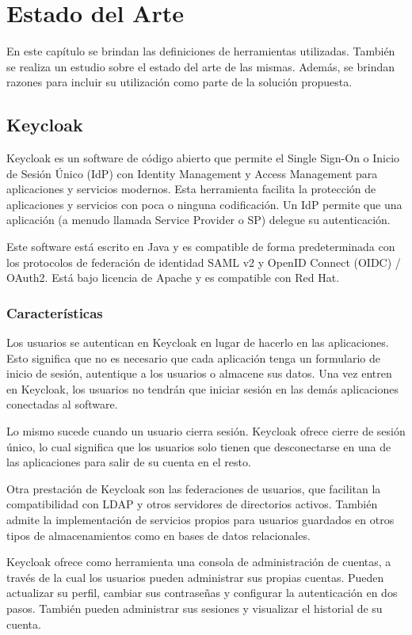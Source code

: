 \chapter{Estado del Arte}\label{chapter:state-of-the-art}
En este capítulo se brindan las definiciones de herramientas utilizadas. También se realiza un estudio sobre el estado del arte de las mismas. Además, se brindan razones para incluir su utilización como parte de la solución propuesta.

\section{Keycloak}
Keycloak es un software de código abierto que permite el Single Sign-On o Inicio de Sesión Único (IdP) con Identity Management y Access Management para aplicaciones y servicios modernos. Esta herramienta facilita la protección de aplicaciones y servicios con poca o ninguna codificación. Un IdP permite que una aplicación (a menudo llamada Service Provider o SP) delegue su autenticación.

Este software está escrito en Java y es compatible de forma predeterminada con los protocolos de federación de identidad SAML v2 y OpenID Connect (OIDC) / OAuth2. Está bajo licencia de Apache y es compatible con Red Hat.

	\subsection{Características}
	Los usuarios se autentican en Keycloak en lugar de hacerlo en las aplicaciones. Esto significa que no es necesario que cada aplicación tenga un formulario de inicio de sesión, autentique a los usuarios o almacene sus datos. Una vez entren en Keycloak, los usuarios no tendrán que iniciar sesión en las demás aplicaciones conectadas al software.
	
	Lo mismo sucede cuando un usuario cierra sesión. Keycloak ofrece cierre de sesión único, lo cual significa que los usuarios solo tienen que desconectarse en una de las aplicaciones para salir de su cuenta en el resto.
	
	Otra prestación de Keycloak son las federaciones de usuarios, que facilitan la compatibilidad con LDAP y otros servidores de directorios activos. También admite la implementación de servicios propios para usuarios guardados en otros tipos de almacenamientos como en bases de datos relacionales.
	
	Keycloak ofrece como herramienta una consola de administración de cuentas, a través de la cual los usuarios pueden administrar sus propias cuentas. Pueden actualizar su perfil, cambiar sus contraseñas y configurar la autenticación en dos pasos. También pueden administrar sus sesiones y visualizar el historial de su cuenta.
	
